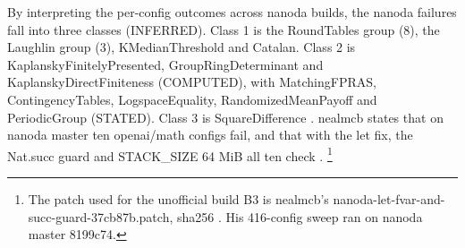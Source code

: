 By interpreting the per-config outcomes across nanoda builds, the nanoda failures fall into three classes (INFERRED). %
Class 1 is the RoundTables group (8), the Laughlin group (3), KMedianThreshold and Catalan. %
Class 2 is KaplanskyFinitelyPresented, GroupRingDeterminant and KaplanskyDirectFiniteness (COMPUTED), with MatchingFPRAS, ContingencyTables, LogspaceEquality, RandomizedMeanPayoff and PeriodicGroup (STATED). %
Class 3 is SquareDifference \cite{nanoda-issue-62}. %
nealmcb states that on nanoda master ten openai/math configs fail, and that with the let fix, the Nat.succ guard and STACK\_SIZE 64 MiB all ten check \cite{nanoda-issue-61}. %
\footnote{The patch used for the unofficial build B3 is nealmcb's nanoda-let-fvar-and-succ-guard-37cb87b.patch, sha256 . %
His 416-config sweep ran on nanoda master 8199c74. %
}
